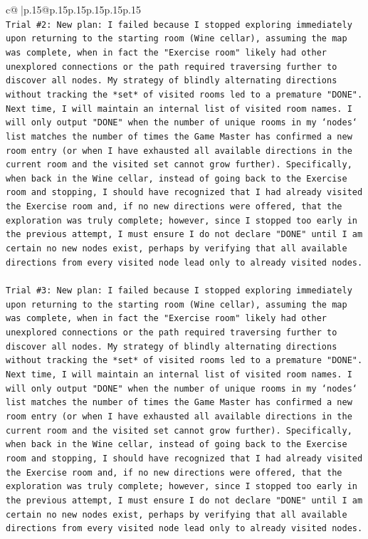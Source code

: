 \documentclass{article}
\begin{document}
{\begin{supertabular}{c@{$\;$}|p{.15\linewidth}@{}p{.15\linewidth}p{.15\linewidth}p{.15\linewidth}p{.15\linewidth}p{.15\linewidth}}
{{{\\ 
\texttt{Trial \#2: New plan: I failed because I stopped exploring immediately upon returning to the starting room (Wine cellar), assuming the map was complete, when in fact the "Exercise room" likely had other unexplored connections or the path required traversing further to discover all nodes. My strategy of blindly alternating directions without tracking the *set* of visited rooms led to a premature "DONE". Next time, I will maintain an internal list of visited room names. I will only output "DONE" when the number of unique rooms in my `nodes` list matches the number of times the Game Master has confirmed a new room entry (or when I have exhausted all available directions in the current room and the visited set cannot grow further). Specifically, when back in the Wine cellar, instead of going back to the Exercise room and stopping, I should have recognized that I had already visited the Exercise room and, if no new directions were offered, that the exploration was truly complete; however, since I stopped too early in the previous attempt, I must ensure I do not declare "DONE" until I am certain no new nodes exist, perhaps by verifying that all available directions from every visited node lead only to already visited nodes.} \\
\\ 
\texttt{Trial \#3: New plan: I failed because I stopped exploring immediately upon returning to the starting room (Wine cellar), assuming the map was complete, when in fact the "Exercise room" likely had other unexplored connections or the path required traversing further to discover all nodes. My strategy of blindly alternating directions without tracking the *set* of visited rooms led to a premature "DONE". Next time, I will maintain an internal list of visited room names. I will only output "DONE" when the number of unique rooms in my `nodes` list matches the number of times the Game Master has confirmed a new room entry (or when I have exhausted all available directions in the current room and the visited set cannot grow further). Specifically, when back in the Wine cellar, instead of going back to the Exercise room and stopping, I should have recognized that I had already visited the Exercise room and, if no new directions were offered, that the exploration was truly complete; however, since I stopped too early in the previous attempt, I must ensure I do not declare "DONE" until I am certain no new nodes exist, perhaps by verifying that all available directions from every visited node lead only to already visited nodes.} \\
}}}
\end{supertabular}}
\end{document}
